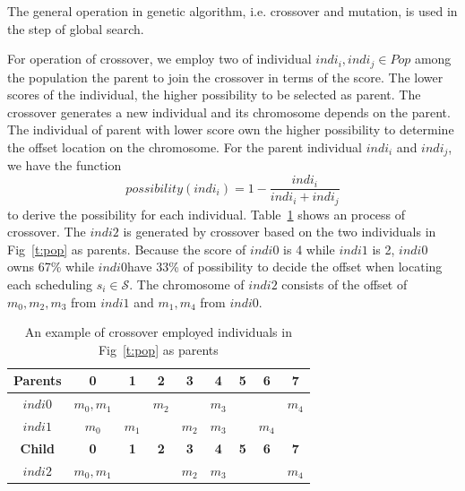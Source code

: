 \documentclass[journal]{IEEEtran}
\newcommand{\calS}{\mathcal{S}}
\theoremstyle{remark}
\begin{document}
The general operation in genetic algorithm,
 i.e. crossover and mutation,
  is used in the step of global search. 

For operation of crossover,
 we employ two of individual $indi_i,indi_j\in Pop$ among the population the parent to join the crossover in terms of the score.
The lower scores of the individual,
 the higher possibility to be selected as parent.
The crossover generates a new individual and its chromosome depends on the parent.
The individual of parent with lower score own the higher possibility to determine the offset location on the chromosome.
For the parent individual $indi_i$ and $indi_j$, we have the function
\begin{equation}
	possibility(indi_i)=1-\frac{indi_i}{indi_i+indi_j}
\end{equation}
to derive the possibility for each individual.
Table~\ref{t:crossover} shows an process of crossover.
The $indi2$ is generated by crossover based on the two individuals in Fig~\ref{t:pop} as parents.
Because the score of $indi0$ is 4 while $indi1$ is 2,
 $indi0$ owns 67\% while $indi0 $have 33\% of possibility to decide the offset when locating each scheduling $s_i\in\calS$.
The chromosome of $indi2$ consists of the offset of $m_0,m_2,m_3$ from $indi1$ and $m_1,m_4$ from $indi0$.
\begin{table}[!t]
	\renewcommand{\arraystretch}{1.3}
	\newcommand{\tabincell}[2]{\begin{tabular}{@{}#1@{}}#2\end{tabular}}
	\caption{An example of crossover employed individuals in Fig~\ref{t:pop} as parents}
	\label{t:crossover}
	\centering
	\begin{tabular}{|c||c||c||c||c||c||c||c||c|}
		\hline
		\textbf{Parents}& 
		\textbf{0} & 
		\textbf{1} & 
		\textbf{2} & 
		\textbf{3} &
		\textbf{4} & 
		\textbf{5} & 
		\textbf{6} & 
		\textbf{7} \\		
		\hline
		$indi0$	&$m_0,m_1$&	&$m_2$&	&$m_3$& & &$m_4$\\		
		\hline		
		$indi1$	&$m_0$&$m_1$&	&$m_2$&$m_3$& &$m_4$&	\\		
		\hline
		\hline
			\textbf{Child}& 
			\textbf{0} & 
			\textbf{1} & 
			\textbf{2} & 
			\textbf{3} &
			\textbf{4} & 
			\textbf{5} & 
			\textbf{6} & 
			\textbf{7} \\		
			\hline
			$indi2$	&$m_0,m_1$&	& &$m_2$&$m_3$& & &$m_4$\\			
		\hline
	\end{tabular}
\end{table}
\end{document}
